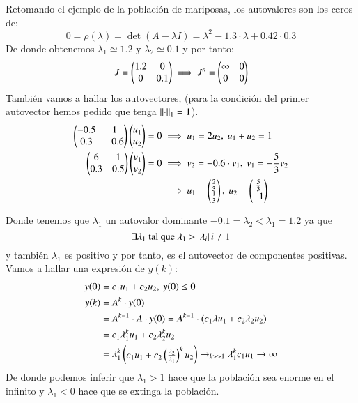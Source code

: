 \begin{eg}

    Retomando el ejemplo de la población de mariposas, los autovalores son los ceros de:
    $$
        0 = \rho(\lambda) = \det(A - \lambda I) = \lambda^2 - 1.3\cdot \lambda + 0.42\cdot 0.3
    $$
    De donde obtenemos $\lambda_1 \simeq 1.2$ y $\lambda_2 \simeq 0.1$ y por tanto:
    $$
        J = \px{1.2 & 0 \\ 0 & 0.1} \implies J^n = \px{\infty & 0 \\ 0 & 0}
    $$
    También vamos a hallar los autovectores, (para la condición del primer autovector hemos pedido que tenga $\left|\left|\cdot\right|\right|_1 = 1$).
    \begin{align*}
        \px{-0.5 & 1\\ 0.3 & -0.6}\px{u_1 \\ u_2} = 0 &\implies u_1 = 2u_2,\ u_1+u_2=1\\
        \px{6 & 1\\ 0.3 & 0.5}\px{v_1 \\ v_2} = 0 &\implies v_2 = -0.6 \cdot v_1,\ v_1 = -\frac{5}{3}v_2\\
        &\implies u_1 = \px{\frac{2}{3} \\ \frac{1}{3}},\ u_2 = \px{\frac{5}{3}\\ -1}
    \end{align*}

    Donde tenemos que $\lambda_1$ un autovalor dominante $-0.1 = \lambda_2 < \lambda_1 = 1.2$ ya que
    $$
        \exists \lambda_1 \text{ tal que } \lambda_1 > \left|\lambda_i\right| i\neq 1
    $$
    y también $\lambda_1$ es positivo y por tanto, es el autovector de componentes positivas.\\
    Vamos a hallar una expresión de $y(k)$:
    \begin{align*}
        y(0) &= c_1 u_1 + c_2 u_2,\ y(0) \leq 0\\
        y(k) &= A^k \cdot y(0)\\
             &= A^{k-1} \cdot A \cdot y(0) = A^{k-1} \cdot(c_1 \lambda u_1 + c_2 \lambda_2 u_2)\\
             &= c_1 \lambda_1^k u_1 + c_2 \lambda_2^k u_2\\
             &= \lambda_1^k \px{c_1 u_1 + c_2 \pfrac{\lambda_2}{\lambda_1}^ku_2} \to_{k>>1} \lambda_1^k c_1 u_1 \to \infty
    \end{align*}
    De donde podemos inferir que $\lambda_1 > 1$ hace que la población sea enorme en el infinito y $\lambda_1 < 0$ hace que se extinga la población.
\end{eg}
